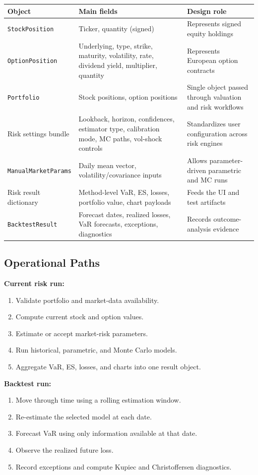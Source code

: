 \documentclass[11pt]{article}
\newcommand{\code}[1]{\texttt{#1}}
\begin{document}
\begin{center}
\begin{tabular}{L{3.5cm}L{5.5cm}L{4.5cm}}
\toprule
\textbf{Object} & \textbf{Main fields} & \textbf{Design role} \\
\midrule
\code{StockPosition}      & Ticker, quantity (signed) & Represents signed equity holdings \\
\code{OptionPosition}     & Underlying, type, strike, maturity, volatility, rate, dividend yield, multiplier, quantity & Represents European option contracts \\
\code{Portfolio}          & Stock positions, option positions & Single object passed through valuation and risk workflows \\
Risk settings bundle      & Lookback, horizon, confidences, estimator type, calibration mode, MC paths, vol-shock controls & Standardizes user configuration across risk engines \\
\code{ManualMarketParams} & Daily mean vector, volatility/covariance inputs & Allows parameter-driven parametric and MC runs \\
Risk result dictionary    & Method-level VaR, ES, losses, portfolio value, chart payloads & Feeds the UI and test artifacts \\
\code{BacktestResult}     & Forecast dates, realized losses, VaR forecasts, exceptions, diagnostics & Records outcome-analysis evidence \\
\bottomrule
\end{tabular}
\end{center}

\subsection{Operational Paths}

\textbf{Current risk run:}
\begin{enumerate}
  \item Validate portfolio and market-data availability.
  \item Compute current stock and option values.
  \item Estimate or accept market-risk parameters.
  \item Run historical, parametric, and Monte Carlo models.
  \item Aggregate VaR, ES, losses, and charts into one result object.
\end{enumerate}

\textbf{Backtest run:}
\begin{enumerate}
  \item Move through time using a rolling estimation window.
  \item Re-estimate the selected model at each date.
  \item Forecast VaR using only information available at that date.
  \item Observe the realized future loss.
  \item Record exceptions and compute Kupiec and Christoffersen diagnostics.
\end{enumerate}
\end{document}
